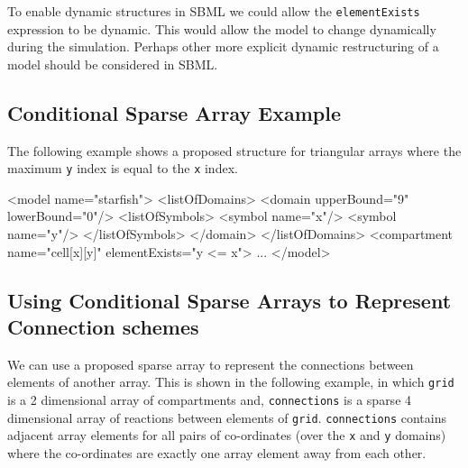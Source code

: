 \documentclass{cekarticle}
\begin{document}
To enable dynamic structures in SBML we could allow the
\texttt{elementExists} expression to be dynamic. This would allow
the model to change dynamically during the simulation.  Perhaps
other more explicit dynamic restructuring of a model should be
considered in SBML.

\subsection{Conditional Sparse Array Example}
\label{sec:sparseeg}

The following example shows a proposed structure for triangular
arrays where the maximum \texttt{y} index is equal to the
\texttt{x} index.

\begin{example}
<model name="starfish">
    <listOfDomains>
        <domain upperBound="9" lowerBound="0"/>
            <listOfSymbols>
                <symbol name="x"/>
                <symbol name="y"/>
            </listOfSymbols>
        </domain>
    </listOfDomains>
    <compartment name="cell[x][y]" elementExists="y <= x">
    ...
</model>
\end{example}

\subsection{Using Conditional Sparse Arrays to Represent Connection schemes}
\label{sec:connections}

We can use a proposed sparse array to represent the connections
between elements of another array.  This is shown in the
following example, in which \texttt{grid} is a 2 dimensional
array of compartments and, \texttt{connections} is a sparse 4
dimensional array of reactions between elements of \texttt{grid}.
\texttt{connections} contains adjacent array elements for all
pairs of co-ordinates (over the \texttt{x} and \texttt{y}
domains) where the co-ordinates are exactly one array element
away from each other.
\end{document}
